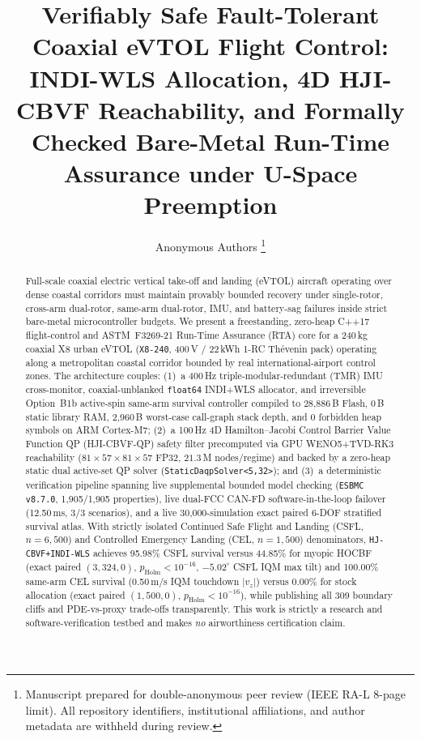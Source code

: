 \documentclass[letterpaper, 10 pt, journal, twoside]{IEEEtran}
\title{Verifiably Safe Fault-Tolerant Coaxial eVTOL Flight Control: INDI-WLS Allocation, 4D HJI-CBVF Reachability, and Formally Checked Bare-Metal Run-Time Assurance under U-Space Preemption}
\author{Anonymous Authors%
\thanks{Manuscript prepared for double-anonymous peer review (IEEE RA-L 8-page limit). All repository identifiers, institutional affiliations, and author metadata are withheld during review.}}
\begin{document}
\maketitle

\begin{abstract}
Full-scale coaxial electric vertical take-off and landing (eVTOL) aircraft operating over dense coastal corridors must maintain provably bounded recovery under single-rotor, cross-arm dual-rotor, same-arm dual-rotor, IMU, and battery-sag failures inside strict bare-metal microcontroller budgets. We present a freestanding, zero-heap C++17 flight-control and ASTM~F3269-21 Run-Time Assurance (RTA) core for a 240\,kg coaxial X8 urban eVTOL (\texttt{X8-240}, 400\,V / 22\,kWh 1-RC Th\'evenin pack) operating along a metropolitan coastal corridor bounded by real international-airport control zones. The architecture couples: (1)~a 400\,Hz triple-modular-redundant (TMR) IMU cross-monitor, coaxial-unblanked \texttt{float64} INDI+WLS allocator, and irreversible Option~B1b active-spin same-arm survival controller compiled to 28{,}886\,B Flash, 0\,B static library RAM, 2{,}960\,B worst-case call-graph stack depth, and 0 forbidden heap symbols on ARM Cortex-M7; (2)~a 100\,Hz 4D Hamilton--Jacobi Control Barrier Value Function QP (HJI-CBVF-QP) safety filter precomputed via GPU WENO5+TVD-RK3 reachability ($81\times 57\times 81\times 57$ FP32, $21.3$\,M nodes/regime) and backed by a zero-heap static dual active-set QP solver (\texttt{StaticDaqpSolver<5,32>}); and (3)~a deterministic verification pipeline spanning live supplemental bounded model checking (\texttt{ESBMC v8.7.0}, 1{,}905/1{,}905 properties), live dual-FCC CAN-FD software-in-the-loop failover (12.50\,ms, 3/3 scenarios), and a live 30{,}000-simulation exact paired 6-DOF stratified survival atlas. With strictly isolated Continued Safe Flight and Landing (CSFL, $n=6{,}500$) and Controlled Emergency Landing (CEL, $n=1{,}500$) denominators, \texttt{HJ-CBVF+INDI-WLS} achieves 95.98\% CSFL survival versus 44.85\% for myopic HOCBF (exact paired $(3{,}324,0)$, $p_{\text{Holm}}<10^{-16}$, $-5.02^\circ$ CSFL IQM max tilt) and 100.00\% same-arm CEL survival (0.50\,m/s IQM touchdown $|v_z|$) versus 0.00\% for stock allocation (exact paired $(1{,}500,0)$, $p_{\text{Holm}}<10^{-16}$), while publishing all 309 boundary cliffs and PDE-vs-proxy trade-offs transparently. This work is strictly a research and software-verification testbed and makes \emph{no} airworthiness certification claim.
\end{abstract}
\end{document}
